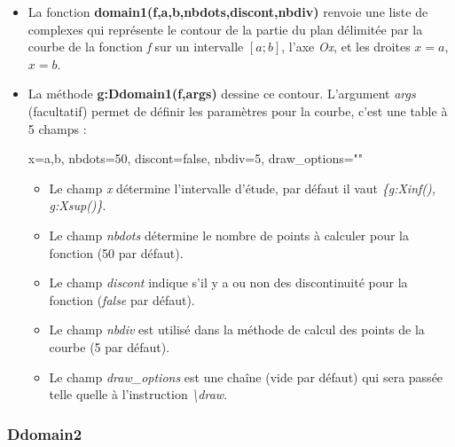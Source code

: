 \begin{itemize}
    \item La fonction \textbf{domain1(f,a,b,nbdots,discont,nbdiv)} renvoie une liste de complexes qui représente le contour de la partie du plan délimitée par la courbe de la fonction \emph{f} sur un intervalle \([a;b]\), l'axe \emph{Ox}, et les droites \(x=a\), \(x=b\).

    \item La méthode \textbf{g:Ddomain1(f,args)} dessine ce contour. L'argument \emph{args} (facultatif) permet de définir les paramètres pour la courbe, c'est une table à 5 champs : 

  \begin{TeXcode}
    { x={a,b},  nbdots=50, discont=false, nbdiv=5, draw_options="" }
  \end{TeXcode}
  
    \begin{itemize}
        \item Le champ \emph{x} détermine l'intervalle d'étude, par défaut il vaut \emph{\{g:Xinf(), g:Xsup()\}}.
        \item Le champ \emph{nbdots} détermine le nombre de points à calculer pour la fonction (50 par défaut).
        \item Le champ \emph{discont} indique s'il y a ou non des discontinuité pour la fonction (\emph{false} par défaut).
        \item Le champ \emph{nbdiv} est utilisé dans la méthode de calcul des points de la courbe (5 par défaut).
        \item Le champ \emph{draw\_options} est une chaîne (vide par défaut) qui sera passée telle quelle à l'instruction \emph{\textbackslash draw}.
    \end{itemize}
\end{itemize}
    
\subsubsection{Ddomain2}

